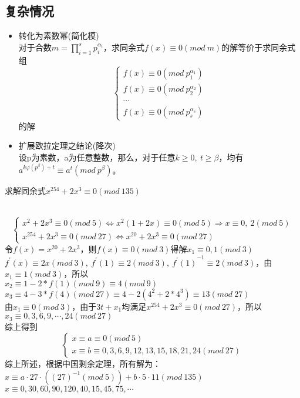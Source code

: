\documentclass[cn,10pt]{elegantbook}
\begin{document}
\subsection{复杂情况}
\begin{itemize}
  \item 转化为素数幂(简化模)
  \\对于合数$m = \prod_{i=1}^s p_i^{\alpha_i}$，求同余式$f(x) \equiv 0(mod\ m)$的解等价于求同余式组
  \[
      \left\{
        \begin{matrix}
          f(x) \equiv 0(mod\ p_1^{\alpha_1})
          \\f(x) \equiv 0(mod\ p_2^{\alpha_2})
          \\ \cdots
          \\f(x) \equiv 0(mod\ p_s^{\alpha_s})
        \end{matrix}
      \right. 
  \]
  的解
  \vskip 0.5cm
  \item 扩展欧拉定理之结论(降次)
  \\设p为素数，a为任意整数，那么，对于任意$k \geq 0,\ t \geq \beta$，均有$a^{k\varphi(p^{\beta})+t} \equiv a^t(mod\ p^{\beta})$。
\end{itemize}
\vskip 0.5cm
\begin{example}
  求解同余式$x^254+2x^3 \equiv 0(mod\ 135)$
\end{example}
\begin{solution}
  \\ \[
    \begin{cases}
      x^2+2x^3 \equiv 0(mod\ 5) \Leftrightarrow x^2(1+2x) \equiv 0(mod\ 5) \Rightarrow x \equiv 0,\ 2 (mod\ 5)
      \\x^{254}+2x^3 \equiv 0(mod\ 27) \Leftrightarrow x^{20}+2x^3 \equiv 0(mod\ 27)
    \end{cases}
  \]
  令$f(x) = x^{20}+2x^3$，则$f(x) \equiv 0(mod\ 3)$得解$x_1 \equiv 0,1(mod\ 3)$
  \\$f^{\prime}(x) \equiv 2x(mod\ 3),\ f^{\prime}(1) \equiv 2(mod\ 3),\ {f^{\prime}(1)}^{-1} \equiv 2(mod\ 3)$，由$x_1 \equiv 1(mod\ 3)$，所以
  \\ $x_2 \equiv 1-2*f(1)(mod\ 9) \equiv 4(mod\ 9)$
  \\ $x_3 \equiv 4-3*f(4)(mod\ 27) \equiv 4-2(4^2+2*4^3) \equiv 13(mod\ 27)$
  \\ 由$x_1 \equiv 0(mod\ 3)$，由于$3t +x_1$均满足$x^{254}+2x^3 \equiv 0(mod\ 27)$，所以$x_3 \equiv 0,3,6,9, \cdots , 24(mod\ 27)$
  \\综上得到
  \[
    \begin{cases}
      x \equiv a \equiv 0(mod\ 5)
      \\ x \equiv b \equiv 0,3,6,9,12,13,15,18,21,24(mod\ 27)
    \end{cases}\]
    综上所述，根据中国剩余定理，所有解为：
    \\$x \equiv a \cdot 27 \cdot ((27)^{-1}(mod\ 5)) + b \cdot 5 \cdot 11(mod\ 135)$
    \\$x \equiv 0,30,60,90,120,40,15,45,75,\cdots$
\end{solution}
\end{document}
